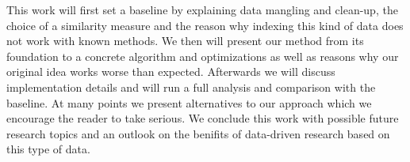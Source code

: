 This work will first set a baseline by explaining data mangling and clean-up, the choice of a similarity measure and the reason why indexing this kind of data does not work with known methods. We then will present our method from its foundation to a concrete algorithm and optimizations as well as reasons why our original idea works worse than expected. Afterwards we will discuss implementation details and will run a full analysis and comparison with the baseline. At many points we present alternatives to our approach which we encourage the reader to take serious. We conclude this work with possible future research topics and an outlook on the benifits of data-driven research based on this type of data.
